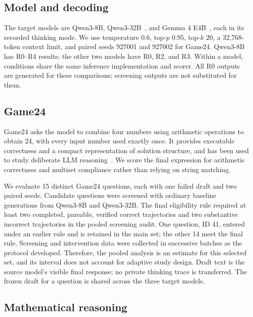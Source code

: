 \documentclass{article}
\begin{document}
\subsection{Model and decoding}

The target models are Qwen3-8B, Qwen3-32B~\citep{qwen2025qwen3}, and Gemma 4 E4B~\citep{google2026gemma4}, each in its recorded thinking mode. We use temperature $0.6$, top-$p$ $0.95$, top-$k$ $20$, a 32,768-token context limit, and paired seeds 927001 and 927002 for Game24. Qwen3-8B has R0--R4 results; the other two models have R0, R2, and R3. Within a model, conditions share the same inference implementation and scorer. All R0 outputs are generated for these comparisons; screening outputs are not substituted for them.

\subsection{Game24}

Game24 asks the model to combine four numbers using arithmetic operations to obtain 24, with every input number used exactly once. It provides executable correctness and a compact representation of solution structure, and has been used to study deliberate LLM reasoning~\citep{yao2023tree}. We score the final expression for arithmetic correctness and multiset compliance rather than relying on string matching.

We evaluate 15 distinct Game24 questions, each with one failed draft and two paired seeds. Candidate questions were screened with ordinary baseline generations from Qwen3-8B and Qwen3-32B. The final eligibility rule required at least two completed, parsable, verified correct trajectories and two substantive incorrect trajectories in the pooled screening audit. One question, ID 41, entered under an earlier rule and is retained in the main set; the other 14 meet the final rule. Screening and intervention data were collected in successive batches as the protocol developed. Therefore, the pooled analysis is an estimate for this selected set, and its interval does not account for adaptive study design. Draft text is the source model's visible final response; no private thinking trace is transferred. The frozen draft for a question is shared across the three target models.

\subsection{Mathematical reasoning}
\end{document}
